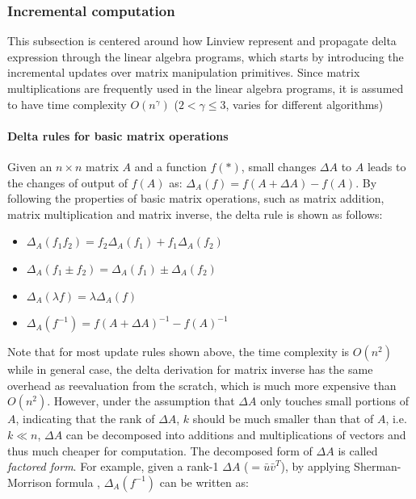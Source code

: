 \subsubsection{Incremental computation}
This subsection is centered around how Linview represent and propagate delta expression through the linear algebra programs, which starts by introducing the incremental updates over matrix manipulation primitives. Since matrix multiplications are frequently used in the linear algebra programs, it is assumed to have time complexity $O(n^{\gamma})$ ($2 < \gamma \leq 3$, varies for different algorithms)

\paragraph{Delta rules for basic matrix operations}
Given an $n \times n$ matrix $A$ and a function $f(*)$, small changes $\Delta A$ to $A$ leads to the changes of output of $f(A)$ as: $\Delta_A(f) = f(A+\Delta A) - f(A)$. By following the properties of basic matrix operations, such as matrix addition, matrix multiplication and matrix inverse, the delta rule is shown as follows:

\begin{center}
    \begin{minipage}{0.4\textwidth}
      \begin{itemize}
        \item $\Delta_A(f_1 f_2) = f_2\Delta_A(f_1) + f_1\Delta_A(f_2)$
        \item $\Delta_A(f_1 \pm f_2) = \Delta_A(f_1) \pm \Delta_A(f_2)$
        \item $\Delta_A(\lambda f) = \lambda \Delta_A(f)$
        \item $\Delta_A(f^{-1}) = f(A+\Delta A)^{-1}-f(A)^{-1}$
      \end{itemize}
    \end{minipage}
  \end{center}

Note that for most update rules shown above, the time complexity is $O(n^2)$ while in general case, the delta derivation for matrix inverse has the same overhead as reevaluation from the scratch, which is much more expensive than $O(n^2)$. However, under the assumption that $\Delta A$ only touches small portions of $A$, indicating that the rank of $\Delta A$, $k$ should be much smaller than that of $A$, i.e. $k \ll n$, $\Delta A$ can be decomposed into additions and multiplications of vectors and thus much cheaper for computation. The decomposed form of $\Delta A$ is called {\em factored form}. For example, given a rank-1 $\Delta A$ ($=\bar{u}\bar{v}^T$), by applying Sherman-Morrison formula \cite{press2007numerical}, $\Delta_A(f^{-1})$ can be written as:

